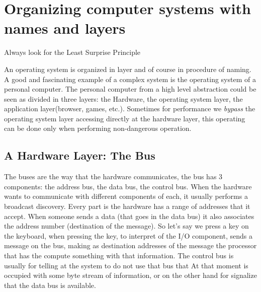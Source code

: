 \documentclass{article}
\begin{document}
  \section{Organizing computer systems with names and layers}
    \epigraph{Always look for the Least Surprise Principle}{\textit{}}
    An operating system is organized in layer and of course in procedure of
    naming. A good and fascinating example of a complex system is the operating
    system of a personal computer. The personal computer from a high level abstraction
    could be seen as divided in three layers: the Hardware, the operating system layer, 
    the application layer(browser, games, etc.). Sometimes for performance we \textit{bypass}
    the operating system layer accessing directly at the hardware layer, this operating
    can be done only when performing non-dangerous operation.
    \subsection{A Hardware Layer: The Bus}
      The buses are the way that the hardware communicates, the bus has 3 components:
      the address bus, the data bus, the control bus. When the hardware wants to communicate
      with different components of each, it usually performs a broadcast discovery. Every
      part is the hardware has a range of addresses that it accept. When someone
      sends a data (that goes in the data bus) it also associates the address number
      (destination of the message). So let's say we press a key on the keyboard, when
      pressing the key, to interpret of the I/O component, sends a message on the 
      bus, making as destination addresses of the message the processor that has the 
      compute something with that information. The control bus is usually for telling 
      at the system to do not use that bus that At that moment is occupied with some 
      byte stream of information, or on the other hand for signalize that the data bus 
      is available.
\end{document}

